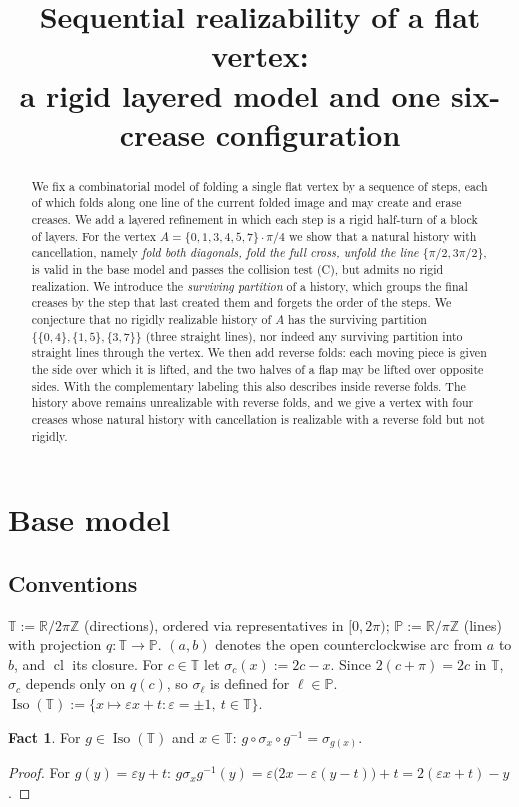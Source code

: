 \documentclass[11pt]{amsart}
\title[Sequential realizability of a flat vertex]{Sequential realizability of a flat vertex:\\
a rigid layered model and one six-crease configuration}
\date{}
\theoremstyle{definition}
\newtheorem{fact}[theorem]{Fact}
\theoremstyle{remark}
\newcommand{\T}{\mathbb{T}}
\newcommand{\Pl}{\mathbb{P}}
\newcommand{\Iso}{\operatorname{Iso}}
\newcommand{\arc}[2]{(#1,#2)}
\newcommand{\cl}{\operatorname{cl}}
\begin{document}
\begin{abstract}
We fix a combinatorial model of folding a single flat vertex by a sequence of steps, each of
which folds along one line of the current folded image and may create and erase creases. We
add a layered refinement in which each step is a rigid half-turn of a block of layers. For the
vertex $A=\{0,1,3,4,5,7\}\cdot\pi/4$ we show that a natural history with cancellation, namely
\emph{fold both diagonals, fold the full cross, unfold the line $\{\pi/2,3\pi/2\}$}, is valid in the base
model and passes the collision test (C), but admits no rigid realization. We introduce the
\emph{surviving partition} of a history, which groups the final creases by the step that last
created them and forgets the order of the steps. We conjecture that no rigidly realizable
history of $A$ has the surviving partition $\{\{0,4\},\{1,5\},\{3,7\}\}$ (three straight lines), nor
indeed any surviving partition into straight lines through the vertex.
We then add reverse folds: each moving piece is given the side over which it is lifted, and the two
halves of a flap may be lifted over opposite sides. With the complementary labeling this also
describes inside reverse folds. The history above remains unrealizable with reverse folds, and we
give a vertex with four creases whose natural history with cancellation is realizable with a
reverse fold but not rigidly.
\end{abstract}
\maketitle


\section{Base model}

\subsection*{Conventions}
$\T := \mathbb{R}/2\pi\mathbb{Z}$ (directions), ordered via representatives in $[0,2\pi)$;
$\Pl := \mathbb{R}/\pi\mathbb{Z}$ (lines) with projection $q\colon \T\to\Pl$.
$\arc{a}{b}$ denotes the open counterclockwise arc from $a$ to $b$, and $\cl$ its closure.
For $c\in\T$ let $\sigma_c(x) := 2c-x$. Since $2(c+\pi)=2c$ in $\T$, $\sigma_c$ depends only on
$q(c)$, so $\sigma_\ell$ is defined for $\ell\in\Pl$.
$\Iso(\T) := \{x\mapsto \varepsilon x+t : \varepsilon=\pm1,\ t\in\T\}$.

\begin{fact}\label{fact:conj}
For $g\in\Iso(\T)$ and $x\in\T$: $g\circ\sigma_x\circ g^{-1}=\sigma_{g(x)}$.
\end{fact}
\begin{proof}
For $g(y)=\varepsilon y+t$: $g\sigma_x g^{-1}(y)=\varepsilon\bigl(2x-\varepsilon(y-t)\bigr)+t
=2(\varepsilon x+t)-y$.
\end{proof}
\end{document}
